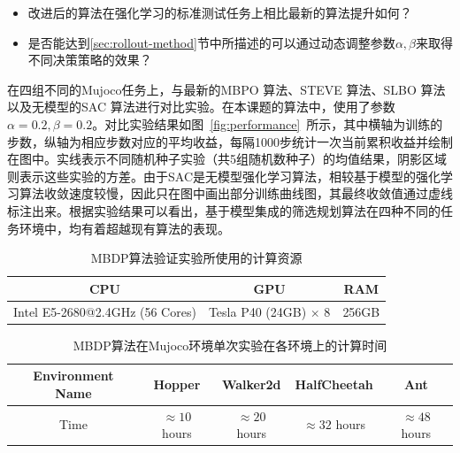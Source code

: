 \begin{itemize}
    \item 改进后的算法在强化学习的标准测试任务上相比最新的算法提升如何？
    \item 是否能达到\ref{sec:rollout-method}节中所描述的可以通过动态调整参数$\alpha,\beta$来取得不同决策策略的效果？
\end{itemize}

在四组不同的Mujoco任务上，与最新的MBPO \cite{janner2019trust}算法、STEVE \cite{buckman2018sample}算法、SLBO \cite{Luo2019AlgorithmicGuarantees}算法以及无模型的SAC \cite{haarnoja2018soft}算法进行对比实验。在本课题的算法中，使用了参数$\alpha=0.2, \beta=0.2$。对比实验结果如图~\ref{fig:performance}~所示，其中横轴为训练的步数，纵轴为相应步数对应的平均收益，每隔1000步统计一次当前累积收益并绘制在图中。实线表示不同随机种子实验（共5组随机数种子）的均值结果，阴影区域则表示这些实验的方差。由于SAC是无模型强化学习算法，相较基于模型的强化学习算法收敛速度较慢，因此只在图中画出部分训练曲线图，其最终收敛值通过虚线标注出来。根据实验结果可以看出，基于模型集成的筛选规划算法在四种不同的任务环境中，均有着超越现有算法的表现。

\begin{table}[ht]
\centering
\begin{tabular}{c|c|c}
\toprule[2pt]
CPU                      & GPU                         & RAM   \\
\midrule[1pt]
Intel E5-2680@2.4GHz (56 Cores) & Tesla P40 (24GB) $\times$ 8 & 256GB\\
\bottomrule[2pt]
\end{tabular}
\caption{MBDP算法验证实验所使用的计算资源}
\label{tab:computing-resources}
\end{table}

\begin{table}[ht]
\centering
\begin{tabular}{c|c|c|c|c}
\toprule
Environment Name  & Hopper      & Walker2d    & HalfCheetah & Ant         \\
\midrule
Time & $\approx 10$ hours & $\approx 20$ hours & $\approx 32$ hours & $\approx 48$ hours \\
\bottomrule
\end{tabular}
\caption{MBDP算法在Mujoco环境单次实验在各环境上的计算时间}
\label{tab:run-time}
\end{table}

